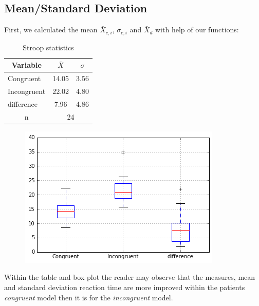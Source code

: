 \documentclass[8pt]{article}
\newcommand{\8}{\bar}
\begin{document}
\subsection{Mean/Standard Deviation} 
First, we calculated the mean $\bar{X}_{c,i}$, $\sigma_{c,i}$ and $\bar{X}_{d}$ with help of our functions: 
\begin{table}[htbp]\centering \caption{Stroop statistics \label{sumstat}}
\begin{tabular}{l c c  }\hline\hline
\multicolumn{1}{c}{\textbf{Variable}} & $\bar{X}$ & $\sigma$ \\ \hline
Congruent & 14.05 & 3.56  \\
Incongruent & 22.02 & 4.80  \\
difference & 7.96 & 4.86 \\ 
\multicolumn{1}{c}{n} & \multicolumn{2}{c}{24}\\ \hline
\end{tabular}
\end{table}
\begin{figure}[H]
	\includegraphics{box_plot.png}
\end{figure}
Within the table and box plot the reader may observe that the measures, mean and standard deviation reaction time are more improved within the patients \textit{congruent} model then it is for the \textit{incongruent} model. 
\end{document}
